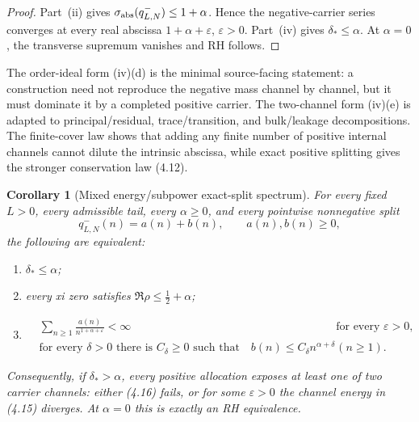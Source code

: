 \documentclass[11pt]{article}
\newtheorem{corollary}[theorem]{Corollary}
\begin{document}
\begin{proof}
Part~\textup{(ii)} gives
$\sigma_{\rm abs}(q_{L,N}^-)\le1+\alpha$.  Hence the negative-carrier series converges at every
real abscissa $1+\alpha+\varepsilon$, $\varepsilon>0$.  Part~\textup{(iv)} gives
$\delta_*\le\alpha$.  At $\alpha=0$, the transverse supremum vanishes and RH follows.
\end{proof}

The order-ideal form \textup{(iv)(d)} is the minimal source-facing statement: a construction need
not reproduce the negative mass channel by channel, but it must dominate it by a completed
positive carrier.  The two-channel form \textup{(iv)(e)} is adapted to principal/residual,
trace/transition, and bulk/leakage decompositions.  The finite-cover law shows that adding any
finite number of positive internal channels cannot dilute the intrinsic abscissa, while exact
positive splitting gives the stronger conservation law \textup{(4.12)}.

\begin{corollary}[Mixed energy/subpower exact-split spectrum]
\label{thm:exact-carrier}
For every fixed $L>0$, every admissible tail, every $\alpha\ge0$, and every pointwise
nonnegative split
\[
 q_{L,N}^-(n)=a(n)+b(n),\qquad a(n),b(n)\ge0,
\]
the following are equivalent:
\begin{enumerate}[label=\textup{(\roman*)}]
\item $\delta_*\le\alpha$;
\item every xi zero satisfies $\Re\rho\le\frac12+\alpha$;
\item
\begin{align}
 &\sum_{n\ge1}\frac{a(n)}{n^{1+\alpha+\varepsilon}}<\infty
   &&\text{for every }\varepsilon>0,
   \tag{4.15}\\
 &\text{for every }\delta>0\text{ there is }C_\delta\ge0\text{ such that}
   \quad b(n)\le C_\delta n^{\alpha+\delta}
   && (n\ge1).
   \tag{4.16}
\end{align}
\end{enumerate}
Consequently, if $\delta_*>\alpha$, every positive allocation exposes at least one of two
carrier channels: either \textup{(4.16)} fails, or for some $\varepsilon>0$ the channel energy
in \textup{(4.15)} diverges.  At $\alpha=0$ this is exactly an RH equivalence.
\end{corollary}
\end{document}

